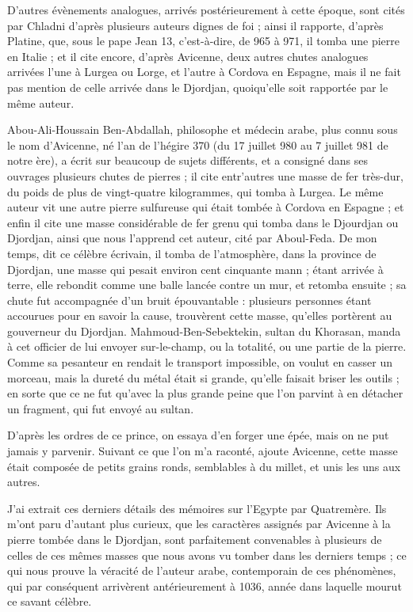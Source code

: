 \documentclass[a4paper, 12pt, oneside, french]{article}
\begin{document}
D'autres évènements analogues, arrivés postérieurement à cette époque, sont cités par Chladni d'après plusieurs auteurs dignes de foi ; ainsi il rapporte, d'après Platine, que, sous le pape Jean 13, c'est-à-dire, de 965 à 971, il tomba une pierre en Italie ; et il cite encore, d'après Avicenne, deux autres chutes analogues arrivées l'une à Lurgea ou Lorge, et l'autre à Cordova en Espagne, mais il ne fait pas mention de celle arrivée dans le Djordjan, quoiqu'elle soit rapportée par le même auteur.

Abou-Ali-Houssain Ben-Abdallah, philosophe et médecin arabe, plus connu sous le nom d'Avicenne, né l'an de l'hégire 370 (du 17 juillet 980 au 7 juillet 981 de notre ère), a écrit sur beaucoup de sujets différents, et a consigné dans ses ouvrages plusieurs chutes de pierres ; il cite entr'autres une masse de fer très-dur, du poids de plus de vingt-quatre kilogrammes, qui tomba à Lurgea. Le même auteur vit une autre pierre sulfureuse qui était tombée à Cordova en Espagne ; et enfin il cite une masse considérable de fer grenu qui tomba dans le Djourdjan ou Djordjan, ainsi que nous l'apprend cet auteur, cité par Aboul-Feda. \og De mon temps, dit ce célèbre écrivain, il tomba de l'atmosphère, dans la province de Djordjan, une masse qui pesait environ cent cinquante mann ; étant arrivée à terre, elle rebondit comme une balle lancée contre un mur, et retomba ensuite ; sa chute fut accompagnée d'un bruit épouvantable : plusieurs personnes étant accourues pour en savoir la cause, trouvèrent cette masse, qu'elles portèrent au gouverneur du Djordjan. Mahmoud-Ben-Sebektekin, sultan du Khorasan, manda à cet officier de lui envoyer sur-le-champ, ou la totalité, ou une partie de la pierre. Comme sa pesanteur en rendait le transport impossible, on voulut en casser un morceau, mais la dureté du métal était si grande, qu'elle faisait briser les outils ; en sorte que ce ne fut qu'avec la plus grande peine que l'on parvint à en détacher un fragment, qui fut envoyé au sultan. \fg

\og D'après les ordres de ce prince, on essaya d'en forger une épée, mais on ne put jamais y parvenir. Suivant ce que l'on m'a raconté, ajoute Avicenne, cette masse était composée de petits grains ronds, semblables à du millet, et unis les uns aux autres. \fg

J'ai extrait ces derniers détails des mémoires sur l'Egypte par Quatremère. Ils m'ont paru d'autant plus curieux, que les caractères assignés par Avicenne à la pierre tombée dans le Djordjan, sont parfaitement convenables à plusieurs de celles de ces mêmes masses que nous avons vu tomber dans les derniers temps ; ce qui nous prouve la véracité de l'auteur arabe, contemporain de ces phénomènes, qui par conséquent arrivèrent antérieurement à 1036, année dans laquelle mourut ce savant célèbre.
\end{document}

